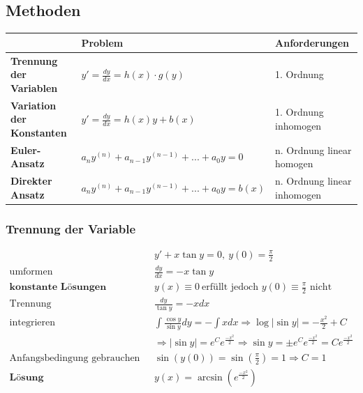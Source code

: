 \documentclass[11pt]{article}
\begin{document}
\subsection{Methoden}

\begin{table}[H]
\centering
\begin{tabular}{|p{5cm}|p{6cm}|p{3cm}|}
\hline
                                  	& \textbf{Problem} 							& \textbf{Anforderungen} 			\\ \hline
\textbf{Trennung der Variablen}   	& $y' = \frac{dy}{dx} = h(x) \cdot g(y)$ 	& 1. Ordnung			            \\ \hline
\textbf{Variation der Konstanten}	& $y' = \frac{dy}{dx} = h(x)y + b(x)$	 	& 1. Ordnung \filbreak inhomogen	\\ \hline
\textbf{Euler-Ansatz}				& $a_{n}y^{(n)} + a_{n-1}y^{(n-1)} + ... + a_{0}y = 0$	 	& n. Ordnung \filbreak linear \filbreak homogen	\\ \hline
\textbf{Direkter Ansatz}				& $a_{n}y^{(n)} + a_{n-1}y^{(n-1)} + ... + a_{0}y = b(x)$	& n. Ordnung \filbreak linear \filbreak inhomogen	\\ \hline

\end{tabular}
\end{table}

\subsubsection{Trennung der Variable}

\begin{equation*}
\begin{split}
	& y' + x \tan y = 0,\ y(0) = \frac{\pi}{2} \\
	\text{umformen}\quad & \frac{dy}{dx} = -x \tan y \\
	\textbf{konstante L{\"o}sungen}\quad & y(x) \equiv 0\ \text{erf{\"u}llt jedoch $y(0) \equiv \frac{\pi}{2}$ nicht} \\
	\text{Trennung}\quad & \frac{dy}{\tan y} = -x dx \\
	\text{integrieren}\quad & \int\frac{\cos y}{\sin y}dy = - \int xdx \Rightarrow \log|\sin y| = -\frac{x^2}{2} + C \\
	& \Rightarrow |\sin y| = e^Ce^{\frac{-x^2}{2}} \Rightarrow \sin y = \pm e^Ce^{\frac{-x^2}{2}} = Ce^{\frac{-x^2}{2}} \\
	\text{Anfangsbedingung gebrauchen}\quad & \sin(y(0)) = \sin (\frac{\pi}{2}) = 1 \Rightarrow C = 1 \\
	\textbf{L{\"o}sung}\quad & y(x) = \arcsin (e^{\frac{-x^2}{2}})
\end{split}
\end{equation*}
\end{document}

